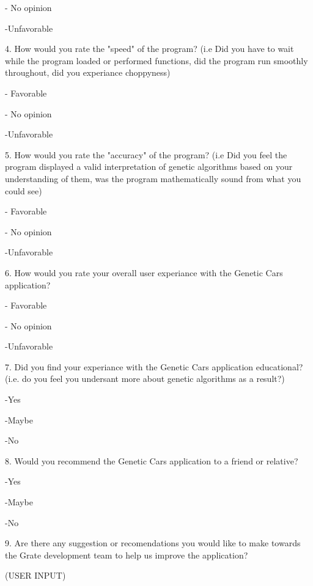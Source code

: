 \documentclass[12pt, titlepage]{article}
\begin{document}
- No opinion

-Unfavorable

4. How would you rate the "speed" of the program? (i.e Did you have to wait while the program loaded or performed functions, did the program run smoothly throughout, did you experiance choppyness)

- Favorable

- No opinion

-Unfavorable

5. How would you rate the "accuracy" of the program? (i.e Did you feel the program displayed a valid interpretation of genetic algorithms based on your understanding of them, was the program mathematically sound from what you could see)

- Favorable

- No opinion

-Unfavorable

6. How would you rate your overall user experiance with the Genetic Cars application?

- Favorable

- No opinion

-Unfavorable

7. Did you find your experiance with the Genetic Cars application educational? (i.e. do you feel you undersant more about genetic algorithms as a result?)

-Yes

-Maybe

-No

8. Would you recommend the Genetic Cars application to a friend or relative?

-Yes

-Maybe

-No

9. Are there any suggestion or recomendations you would like to make towards the Grate development team to help us improve the application?

(USER INPUT)
\end{document}
